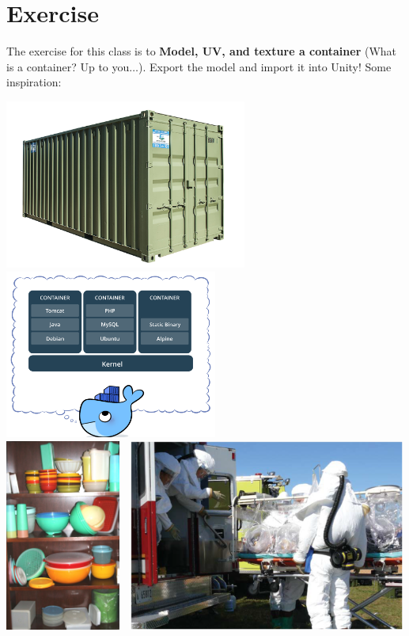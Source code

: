 \documentclass[11pt]{article}
\begin{document}
\section{Exercise}

The exercise for this class is to \textbf{Model, UV, and texture a container} (What is a container?
Up to you$\dots$).  Export the model and import it into Unity!  Some inspiration:

\begin{center}
\includegraphics[height=15em]{container-1}
\includegraphics[height=15em]{container-2}\\\vspace{3em}
\includegraphics[height=17em]{container-3}\ \ 
\includegraphics[height=17em]{container-4} 
\end{center}
\end{document}
